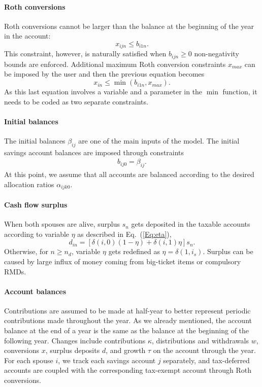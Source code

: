 \documentclass{report}[fleqn,11pt]
\begin{document}
\paragraph*{Roth conversions}
	Roth conversions cannot be larger than the balance at the beginning of the year in the account:
	\begin{equation}
		x_{ijn} \le b_{i1n}.
	\end{equation}
	This constraint, however, is naturally satisfied when $b_{ijn} \ge 0$ non-negativity bounds are enforced.
	Additional maximum Roth conversion constraints $x_{max}$ can be imposed by the user and
	then the previous equation becomes
	\begin{equation}
		x_{in} \le \min(b_{i1n}, x_{max}).
	\end{equation}
	As this last equation involves a variable and a parameter in the $\min$ function,
	it needs to be coded as two separate constraints.

\paragraph*{Initial balances}
	The initial balances $\beta_{ij}$ are one of the main inputs of the model.
	The initial savings account balances are imposed through constraints
	\begin{eqnarray}
		\label{Eq:InitialBalance}
		b_{ij0} = \beta_{ij}.
	\end{eqnarray}
	At this point, we assume that all accounts are balanced according to the desired
	allocation ratios $\alpha_{ijk0}$.

\paragraph*{Cash flow surplus}
	When both spouses are alive, surplus $s_n$ gets deposited in the taxable accounts
	according to variable $\eta$ as described in Eq.~(\ref{Eq:eta}),
	\begin{equation}
		\label{Eq:eta2}
		d_{in} = [\delta(i, 0)(1 - \eta) + \delta(i, 1)\eta] s_n .
	\end{equation}
	Otherwise, for $n \ge n_d$, variable $\eta$ gets redefined as $\eta = \delta(1, i_s)$.
	Surplus can be caused by large influx of money coming from big-ticket items or compulsory RMDs.

\paragraph*{Account balances}
	Contributions are assumed to be made at half-year to better represent periodic contributions
	made throughout the year. As we already mentioned,
	the account balance at the end of a year is the same as the balance
	at the beginning of the following year.
	Changes include contributions $\kappa$, distributions and withdrawals $w$,
	conversions $x$, surplus deposits $d$, and growth $\tau$ on the account through the year.
	For each spouse $i$, we track each savings account $j$ separately, and tax-deferred accounts
	are coupled with the corresponding tax-exempt account through Roth conversions.
\end{document}

